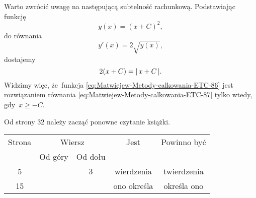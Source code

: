 \documentclass[a4paper,11pt]{article}
\numberwithin{equation}{section}
\begin{document}
\VerSpaceFour





\noindent
{} Warto zwrócić uwagę na następującą subtelność rachunkową.
Podstawiając funkcję
\begin{equation}
  \label{eq:Matwiejew-Metody-calkowania-ETC-86}
  y( x ) = ( x + C )^{ 2 },
\end{equation}
do równania
\begin{equation}
  \label{eq:Matwiejew-Metody-calkowania-ETC-87}
  y'( x ) = 2 \sqrt{ y( x ) },
\end{equation}
dostajemy
\begin{equation}
  \label{eq:Matwiejew-Metody-calkowania-ETC-88}
  2 ( x + C ) = |\, {  x + C  } \,|.
\end{equation}
Widzimy więc, że~funkcja \eqref{eq:Matwiejew-Metody-calkowania-ETC-86}
jest rozwiązaniem równania \eqref{eq:Matwiejew-Metody-calkowania-ETC-87}
tylko wtedy, gdy~$x \geq -C$.

{\Large Od strony 32 należy zacząć ponowne czytanie książki.}























\newpage



\begin{center}

  \begin{tabular}{|c|c|c|c|c|}
    \hline
    Strona & \multicolumn{2}{c|}{Wiersz} & Jest
                              & Powinno być \\ \cline{2-3}
    & Od góry & Od dołu & & \\
    \hline
    5   & &  3 & wierdzenia & twierdzenia \\
    15  & & & ono określa & określa ono \\
    \hline
  \end{tabular}

\end{center}
\end{document}
